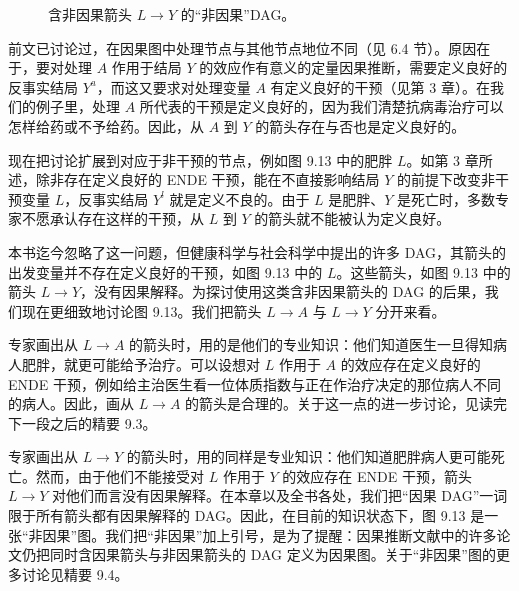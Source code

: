 \begin{figure}[htbp]
\centering
{}
\caption{含非因果箭头 $L\rightarrow Y$ 的“非因果”DAG。}
\label{fig:9.13}
\end{figure}

前文已讨论过，在因果图中处理节点与其他节点地位不同（见 6.4 节）。原因在于，要对处理 $A$ 作用于结局 $Y$ 的效应作有意义的定量因果推断，需要定义良好的反事实结局 $Y^{a}$，而这又要求对处理变量 $A$ 有定义良好的干预（见第 3 章）。在我们的例子里，处理 $A$ 所代表的干预是定义良好的，因为我们清楚抗病毒治疗可以怎样给药或不予给药。因此，从 $A$ 到 $Y$ 的箭头存在与否也是定义良好的。

现在把讨论扩展到对应于非干预的节点，例如图 9.13 中的肥胖 $L$。如第 3 章所述，除非存在定义良好的 ENDE 干预，能在不直接影响结局 $Y$ 的前提下改变非干预变量 $L$，反事实结局 $Y^{l}$ 就是定义不良的。由于 $L$ 是肥胖、$Y$ 是死亡时，多数专家不愿承认存在这样的干预，从 $L$ 到 $Y$ 的箭头就不能被认为定义良好。

本书迄今忽略了这一问题，但健康科学与社会科学中提出的许多 DAG，其箭头的出发变量并不存在定义良好的干预，如图 9.13 中的 $L$。这些箭头，如图 9.13 中的箭头 $L\rightarrow Y$，没有因果解释。为探讨使用这类含非因果箭头的 DAG 的后果，我们现在更细致地讨论图 9.13。我们把箭头 $L\rightarrow A$ 与 $L\rightarrow Y$ 分开来看。

专家画出从 $L\rightarrow A$ 的箭头时，用的是他们的专业知识：他们知道医生一旦得知病人肥胖，就更可能给予治疗。可以设想对 $L$ 作用于 $A$ 的效应存在定义良好的 ENDE 干预，例如给主治医生看一位体质指数与正在作治疗决定的那位病人不同的病人。因此，画从 $L\rightarrow A$ 的箭头是合理的。关于这一点的进一步讨论，见读完下一段之后的精要 9.3。

专家画出从 $L\rightarrow Y$ 的箭头时，用的同样是专业知识：他们知道肥胖病人更可能死亡。然而，由于他们不能接受对 $L$ 作用于 $Y$ 的效应存在 ENDE 干预，箭头 $L\rightarrow Y$ 对他们而言没有因果解释。在本章以及全书各处，我们把“因果 DAG”一词限于所有箭头都有因果解释的 DAG。因此，在目前的知识状态下，图 9.13 是一张“非因果”图。我们把“非因果”加上引号，是为了提醒：因果推断文献中的许多论文仍把同时含因果箭头与非因果箭头的 DAG 定义为因果图。关于“非因果”图的更多讨论见精要 9.4。

